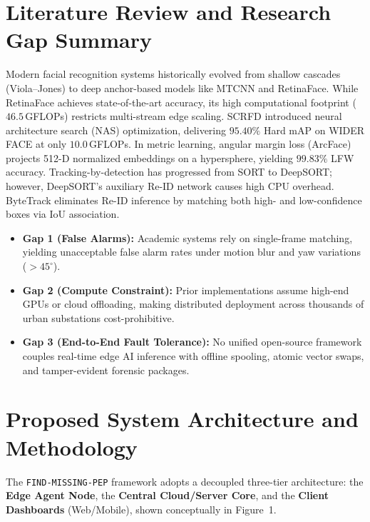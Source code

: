\documentclass[10pt, a4paper]{article}
\begin{document}
\section{Literature Review and Research Gap Summary}
Modern facial recognition systems historically evolved from shallow cascades (Viola--Jones) to deep anchor-based models like MTCNN and RetinaFace. While RetinaFace achieves state-of-the-art accuracy, its high computational footprint ($46.5$\,GFLOPs) restricts multi-stream edge scaling. SCRFD introduced neural architecture search (NAS) optimization, delivering $95.40\%$ Hard mAP on WIDER FACE at only $10.0$\,GFLOPs. In metric learning, angular margin loss (ArcFace) projects 512-D normalized embeddings on a hypersphere, yielding $99.83\%$ LFW accuracy. Tracking-by-detection has progressed from SORT to DeepSORT; however, DeepSORT's auxiliary Re-ID network causes high CPU overhead. ByteTrack eliminates Re-ID inference by matching both high- and low-confidence boxes via IoU association.
\begin{itemize}
    \item \textbf{Gap 1 (False Alarms):} Academic systems rely on single-frame matching, yielding unacceptable false alarm rates under motion blur and yaw variations ($>45^\circ$).
    \item \textbf{Gap 2 (Compute Constraint):} Prior implementations assume high-end GPUs or cloud offloading, making distributed deployment across thousands of urban substations cost-prohibitive.
    \item \textbf{Gap 3 (End-to-End Fault Tolerance):} No unified open-source framework couples real-time edge AI inference with offline spooling, atomic vector swaps, and tamper-evident forensic packages.
\end{itemize}

\newpage

\section{Proposed System Architecture and Methodology}
The \texttt{FIND-MISSING-PEP} framework adopts a decoupled three-tier architecture: the \textbf{Edge Agent Node}, the \textbf{Central Cloud/Server Core}, and the \textbf{Client Dashboards} (Web/Mobile), shown conceptually in Figure~1.
\end{document}
